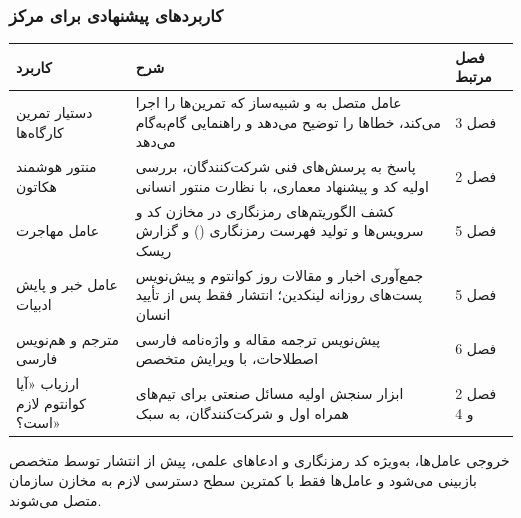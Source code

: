 \documentclass[a4paper,12pt]{article}
\begin{document}
	\subsubsection*{کاربردهای پیشنهادی برای مرکز}
	\begin{center}
	{\small
	\renewcommand{\arraystretch}{1.3}
	\begin{tabularx}{\textwidth}{|>{\raggedleft\arraybackslash}p{3.4cm}|X|>{\raggedleft\arraybackslash}p{2.4cm}|}
		\hline
		\rowcolor{mci-light}\textbf{کاربرد} & \textbf{شرح} & \textbf{فصل مرتبط} \\
		\hline
		دستیار تمرین کارگاه‌ها & عامل متصل به \lr{Qiskit Code Assistant} و شبیه‌ساز که تمرین‌ها را اجرا می‌کند، خطاها را توضیح می‌دهد و راهنمایی گام‌به‌گام می‌دهد & فصل 3 \\
		\hline
		منتور هوشمند هکاتون & پاسخ به پرسش‌های فنی شرکت‌کنندگان، بررسی اولیه کد و پیشنهاد معماری، با نظارت منتور انسانی & فصل 2 \\
		\hline
		عامل مهاجرت \lr{PQC} & کشف الگوریتم‌های رمزنگاری در مخازن کد و سرویس‌ها و تولید فهرست رمزنگاری (\lr{CBOM}) و گزارش ریسک & فصل 5 \\
		\hline
		عامل خبر و پایش ادبیات & جمع‌آوری اخبار و مقالات روز کوانتوم و پیش‌نویس پست‌های روزانه لینکدین؛ انتشار فقط پس از تأیید انسان & فصل 5 \\
		\hline
		مترجم و هم‌نویس فارسی & پیش‌نویس ترجمه مقاله و واژه‌نامه فارسی اصطلاحات، با ویرایش متخصص & فصل 6 \\
		\hline
		ارزیاب «آیا کوانتوم لازم است؟» & ابزار سنجش اولیه مسائل صنعتی برای تیم‌های همراه اول و شرکت‌کنندگان، به سبک \lr{QuantumMind} & فصل 2 و 4 \\
		\hline
	\end{tabularx}
	}
	\end{center}

	خروجی عامل‌ها، به‌ویژه کد رمزنگاری و ادعاهای علمی، پیش از انتشار توسط متخصص بازبینی می‌شود و عامل‌ها فقط با کمترین سطح دسترسی لازم به مخازن سازمان متصل می‌شوند.


\end{document}
